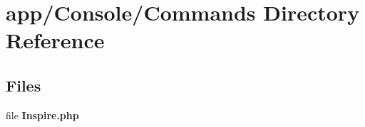 \section{app/\+Console/\+Commands Directory Reference}
\label{dir_d0880c6dc62d6c090631ce1abce36d32}
\subsection*{Files}
\begin{DoxyCompactItemize}
\item 
file {\bf Inspire.\+php}
\end{DoxyCompactItemize}
